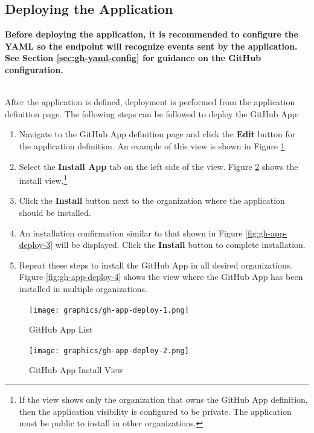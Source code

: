 \FloatBarrier

\subsection{Deploying the Application}

\textbf{Before deploying the application, it is recommended to configure the \cxoneflow YAML
so the endpoint will recognize events sent by the application.  See Section \ref{sec:gh-yaml-config} for guidance on the \cxoneflow
GitHub configuration.}

\noindent\\After the application is defined, deployment is performed from the application
definition page. The following steps can be followed to deploy the \cxoneflow GitHub App:

\begin{enumerate}
    \item Navigate to the GitHub App definition page and click the \textbf{Edit} button for the \cxoneflow
    application definition.  An example of this view is shown in Figure \ref{fig:gh-app-deploy-1}.
    \item Select the \textbf{Install App} tab on the left side of the view.  Figure \ref{fig:gh-app-deploy-2}
    shows the install view.\footnote{If the view shows only the organization that owns the \cxoneflow GitHub App definition,
    then the application visibility is configured to be private.  The application must be public to install in other organizations.}
    \item Click the \textbf{Install} button next to the organization where the application should be installed.
    \item An installation confirmation similar to that shown in Figure \ref{fig:gh-app-deploy-3} will be displayed.
    Click the \textbf{Install} button to complete installation.
    \item Repeat these steps to install the \cxoneflow GitHub App in all desired organizations.  Figure \ref{fig:gh-app-deploy-4}
    shows the view where the GitHub App has been installed in multiple organizations.
\end{enumerate}

\begin{figure}[ht]
    \texttt{[image: graphics/gh-app-deploy-1.png]}
    \caption{GitHub App List}
    \label{fig:gh-app-deploy-1}
\end{figure}

\begin{figure}[ht]
    \texttt{[image: graphics/gh-app-deploy-2.png]}
    \caption{GitHub App Install View}
    \label{fig:gh-app-deploy-2}
\end{figure}


